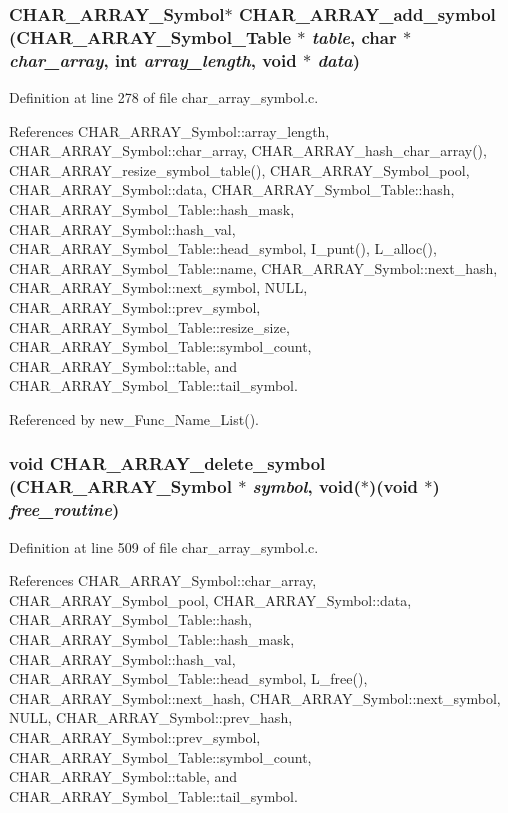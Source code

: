\subsubsection{\setlength{\rightskip}{0pt plus 5cm}\bf{CHAR\_\-ARRAY\_\-Symbol}$\ast$ CHAR\_\-ARRAY\_\-add\_\-symbol (\bf{CHAR\_\-ARRAY\_\-Symbol\_\-Table} $\ast$ {\em table}, char $\ast$ {\em char\_\-array}, int {\em array\_\-length}, void $\ast$ {\em data})}\label{char__array__symbol_8h_66efa3e6d08af925d3d14d8b870fb6b4}




Definition at line 278 of file char\_\-array\_\-symbol.c.

References CHAR\_\-ARRAY\_\-Symbol::array\_\-length, CHAR\_\-ARRAY\_\-Symbol::char\_\-array, CHAR\_\-ARRAY\_\-hash\_\-char\_\-array(), CHAR\_\-ARRAY\_\-resize\_\-symbol\_\-table(), CHAR\_\-ARRAY\_\-Symbol\_\-pool, CHAR\_\-ARRAY\_\-Symbol::data, CHAR\_\-ARRAY\_\-Symbol\_\-Table::hash, CHAR\_\-ARRAY\_\-Symbol\_\-Table::hash\_\-mask, CHAR\_\-ARRAY\_\-Symbol::hash\_\-val, CHAR\_\-ARRAY\_\-Symbol\_\-Table::head\_\-symbol, I\_\-punt(), L\_\-alloc(), CHAR\_\-ARRAY\_\-Symbol\_\-Table::name, CHAR\_\-ARRAY\_\-Symbol::next\_\-hash, CHAR\_\-ARRAY\_\-Symbol::next\_\-symbol, NULL, CHAR\_\-ARRAY\_\-Symbol::prev\_\-symbol, CHAR\_\-ARRAY\_\-Symbol\_\-Table::resize\_\-size, CHAR\_\-ARRAY\_\-Symbol\_\-Table::symbol\_\-count, CHAR\_\-ARRAY\_\-Symbol::table, and CHAR\_\-ARRAY\_\-Symbol\_\-Table::tail\_\-symbol.

Referenced by new\_\-Func\_\-Name\_\-List().
\subsubsection{\setlength{\rightskip}{0pt plus 5cm}void CHAR\_\-ARRAY\_\-delete\_\-symbol (\bf{CHAR\_\-ARRAY\_\-Symbol} $\ast$ {\em symbol}, void($\ast$)(void $\ast$) {\em free\_\-routine})}\label{char__array__symbol_8h_8da46d556f8ea7dadcc01519f27ff54d}




Definition at line 509 of file char\_\-array\_\-symbol.c.

References CHAR\_\-ARRAY\_\-Symbol::char\_\-array, CHAR\_\-ARRAY\_\-Symbol\_\-pool, CHAR\_\-ARRAY\_\-Symbol::data, CHAR\_\-ARRAY\_\-Symbol\_\-Table::hash, CHAR\_\-ARRAY\_\-Symbol\_\-Table::hash\_\-mask, CHAR\_\-ARRAY\_\-Symbol::hash\_\-val, CHAR\_\-ARRAY\_\-Symbol\_\-Table::head\_\-symbol, L\_\-free(), CHAR\_\-ARRAY\_\-Symbol::next\_\-hash, CHAR\_\-ARRAY\_\-Symbol::next\_\-symbol, NULL, CHAR\_\-ARRAY\_\-Symbol::prev\_\-hash, CHAR\_\-ARRAY\_\-Symbol::prev\_\-symbol, CHAR\_\-ARRAY\_\-Symbol\_\-Table::symbol\_\-count, CHAR\_\-ARRAY\_\-Symbol::table, and CHAR\_\-ARRAY\_\-Symbol\_\-Table::tail\_\-symbol.
